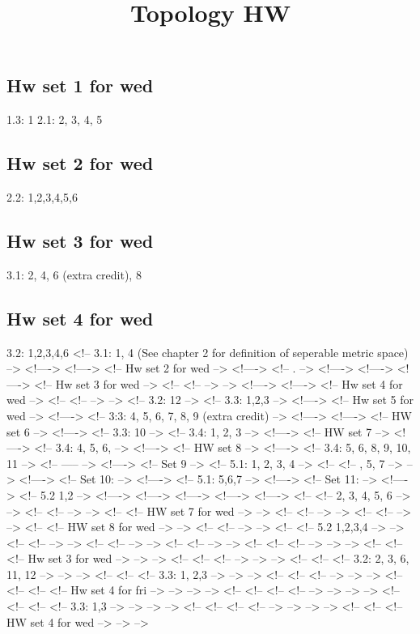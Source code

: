 \documentclass{amsart}
\numberwithin{equation}{section}
\theoremstyle{definition}
\theoremstyle{remark}
\begin{document}
\title{Topology HW}
\maketitle
\subsection{Hw set 1 for wed}
1.3: 1  
2.1: 2, 3, 4, 5  
\subsection{Hw set 2 for wed}
2.2: 1,2,3,4,5,6
\subsection{Hw set 3 for wed}
3.1: 2, 4, 6 (extra credit), 8
\subsection{Hw set 4 for wed}
3.2: 1,2,3,4,6
<!-- 3.1: 1, 4 (See chapter 2 for definition of seperable metric space)   -->
<!---->
<!---->
<!-- Hw set 2 for wed   -->
<!---->
<!-- . -->
<!---->
<!---->
<!---->
<!-- Hw set 3 for wed  -->
<!-- <!--  --> -->
<!---->
<!---->
<!-- Hw set 4 for wed -->
<!-- <!--  --> -->
<!-- 3.2: 12   -->
<!-- 3.3: 1,2,3   -->
<!---->
<!-- Hw set 5 for wed  -->
<!---->
<!-- 3:3: 4, 5, 6, 7, 8, 9 (extra credit)     -->
<!---->
<!---->
<!-- HW set 6 -->
<!---->
<!-- 3.3: 10 -->
<!-- 3.4: 1, 2, 3    -->
<!---->
<!-- HW set 7 -->
<!---->
<!-- 3.4: 4, 5, 6,       -->
<!---->
<!-- HW set 8 -->
<!---->
<!-- 3.4: 5, 6, 8, 9, 10, 11     -->
<!-- -----  -->
<!---->
<!-- Set 9   -->
<!-- 5.1: 1, 2, 3, 4   -->
<!-- <!-- , 5, 7    --> -->
<!---->
<!-- Set 10: -->
<!---->
<!-- 5.1: 5,6,7    -->
<!---->
<!-- Set 11:  -->
<!---->
<!-- 5.2 1,2   -->
<!---->
<!---->
<!---->
<!---->
<!---->
<!-- <!-- 2, 3, 4, 5, 6 --> -->
<!-- <!--  --> -->
<!-- <!-- HW set 7 for wed --> -->
<!-- <!--  --> -->
<!-- <!--  --> -->
<!-- <!-- HW set 8 for wed --> -->
<!-- <!--  --> -->
<!-- <!-- 5.2 1,2,3,4   --> -->
<!-- <!--  --> -->
<!-- <!--  --> -->
<!-- <!--  --> -->
<!-- <!-- <!--  --> --> -->
<!-- <!-- <!-- Hw set 3 for wed --> --> -->
<!-- <!-- <!--  --> --> -->
<!-- <!-- <!-- 3.2: 2, 3, 6, 11, 12   --> --> -->
<!-- <!-- <!-- 3.3: 1, 2,3   --> --> -->
<!-- <!-- <!--  --> --> -->
<!-- <!-- <!-- <!-- Hw set 4 for fri --> --> --> -->
<!-- <!-- <!-- <!--  --> --> --> -->
<!-- <!-- <!-- <!-- 3.3: 1,3 --> --> --> -->
<!-- <!-- <!-- <!--  --> --> --> -->
<!-- <!-- <!-- HW set 4 for wed --> --> -->
\end{document}
